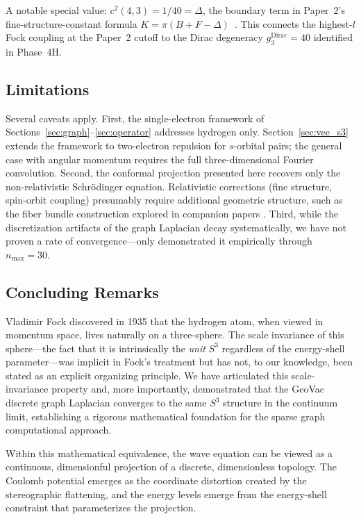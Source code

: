 \documentclass[aps,pra,twocolumn,superscriptaddress,longbibliography]{revtex4-2}
\begin{document}
A notable special value: $c^2(4,3) = 1/40 = \Delta$, the boundary
term in Paper~2's fine-structure-constant formula
$K = \pi(B + F - \Delta)$~\cite{loutey_paper2}.  This connects the
highest-$l$ Fock coupling at the Paper~2 cutoff to the Dirac
degeneracy $g_3^{\mathrm{Dirac}} = 40$ identified in Phase~4H.

\subsection{Limitations}

Several caveats apply. First, the single-electron framework of Sections~\ref{sec:graph}--\ref{sec:operator} addresses hydrogen only. Section~\ref{sec:vee_s3} extends the framework to two-electron repulsion for $s$-orbital pairs; the general case with angular momentum requires the full three-dimensional Fourier convolution. Second, the conformal projection presented here recovers only the non-relativistic Schr\"odinger equation. Relativistic corrections (fine structure, spin-orbit coupling) presumably require additional geometric structure, such as the fiber bundle construction explored in companion papers \cite{loutey_paper0,loutey_paper1}. Third, while the discretization artifacts of the graph Laplacian decay systematically, we have not proven a rate of convergence---only demonstrated it empirically through $n_{\max} = 30$.

\subsection{Concluding Remarks}

Vladimir Fock discovered in 1935 that the hydrogen atom, when viewed in momentum space, lives naturally on a three-sphere. The scale invariance of this sphere---the fact that it is intrinsically the \textit{unit} $S^3$ regardless of the energy-shell parameter---was implicit in Fock's treatment but has not, to our knowledge, been stated as an explicit organizing principle. We have articulated this scale-invariance property and, more importantly, demonstrated that the GeoVac discrete graph Laplacian converges to the same $S^3$ structure in the continuum limit, establishing a rigorous mathematical foundation for the sparse graph computational approach.

Within this mathematical equivalence, the wave equation can be viewed as a continuous, dimensionful projection of a discrete, dimensionless topology. The Coulomb potential emerges as the coordinate distortion created by the stereographic flattening, and the energy levels emerge from the energy-shell constraint that parameterizes the projection.
\end{document}

